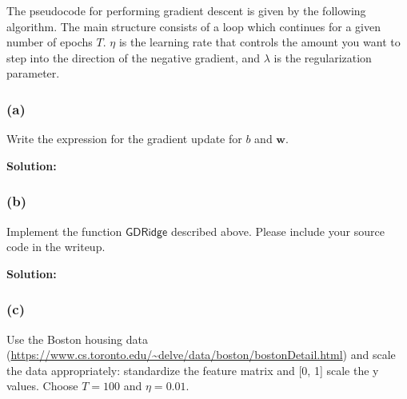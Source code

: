 \documentclass[11pt]{article}
\begin{document}
The pseudocode for performing gradient descent is given by the following algorithm.
The main structure consists of a loop which continues for a given number of epochs
$T$. $\eta$ is the learning rate that controls the amount you want to step into the 
direction of the negative gradient, and $\lambda$ is the regularization parameter.

\begin{algorithmic}[h]
	
		
		
		

	
	\EndFor
	
	\EndFunction
	
\end{algorithmic}

\subsubsection*{(a)}
	Write the expression for the gradient update for $b$ and $\mathbf{w}$.
	
	{\noindent \bf Solution: }
	
	\vfill
\subsubsection*{(b)}
	Implement the function $\mathsf{GDRidge}$ described above. Please include 
	your source code in the writeup.
	
	{\noindent \bf Solution: }
	
	\vfill
\subsubsection*{(c)}
	Use the Boston housing data (\url{https://www.cs.toronto.edu/~delve/data/boston/bostonDetail.html}) and scale the data appropriately: standardize the feature
	matrix and [0, 1] scale the y values. Choose $T = 100$ and $\eta = 0.01$.
\end{document}
